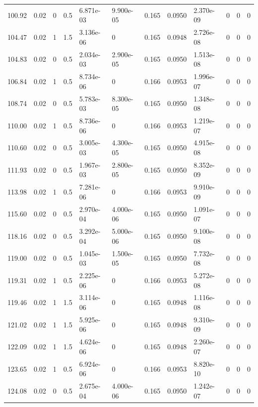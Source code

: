 \documentclass[preview]{standalone}
\begin{document}
{{{\begin{tabular}{L{1.2cm}C{1.2cm} C{0.3cm}C{0.5cm} C{1.4cm}C{1.4cm} C{1.4cm}C{1.4cm} C{1.6cm}C{1.6cm} C{1.6cm}C{1.6cm}}
  100.92  &  0.02  & 0     & 0.5 &  6.871e-03  & 9.900e-05  &  0.165&   0.0950& 2.370e-09 & 0   &  0 & 0  \\ 
  104.47  &  0.02  & 1     & 1.5 &  3.136e-06  & 0  &  0.165&   0.0948& 2.726e-08 & 0   &  0 & 0  \\ 
  104.83  &  0.02  & 0     & 0.5 &  2.034e-03  & 2.900e-05  &  0.165&   0.0950& 1.513e-08 & 0   &  0 & 0  \\ 
  106.84  &  0.02  & 1     & 0.5 &  8.734e-06  & 0  &  0.166&   0.0953& 1.996e-07 & 0   &  0 & 0  \\ 
  108.74  &  0.02  & 0     & 0.5 &  5.783e-03  & 8.300e-05  &  0.165&   0.0950& 1.348e-08 & 0   &  0 & 0  \\ 
  110.00  &  0.02  & 1     & 0.5 &  8.736e-06  & 0  &  0.166&   0.0953& 1.219e-07 & 0   &  0 & 0  \\ 
  110.60  &  0.02  & 0     & 0.5 &  3.005e-03  & 4.300e-05  &  0.165&   0.0950& 4.915e-08 & 0   &  0 & 0  \\ 
  111.93  &  0.02  & 0     & 0.5 &  1.967e-03  & 2.800e-05  &  0.165&   0.0950& 8.352e-09 & 0   &  0 & 0  \\ 
  113.98  &  0.02  & 1     & 0.5 &  7.281e-06  & 0  &  0.166&   0.0953& 9.910e-09 & 0   &  0 & 0  \\ 
  115.60  &  0.02  & 0     & 0.5 &  2.970e-04  & 4.000e-06  &  0.165&   0.0950& 1.091e-07 & 0   &  0 & 0  \\ 
  118.16  &  0.02  & 0     & 0.5 &  3.292e-04  & 5.000e-06  &  0.165&   0.0950& 9.100e-08 & 0   &  0 & 0  \\ 
  119.00  &  0.02  & 0     & 0.5 &  1.045e-03  & 1.500e-05  &  0.165&   0.0950& 7.732e-08 & 0   &  0 & 0  \\ 
  119.31  &  0.02  & 1     & 0.5 &  2.225e-06  & 0  &  0.166&   0.0953& 5.272e-08 & 0   &  0 & 0  \\ 
  119.46  &  0.02  & 1     & 1.5 &  3.114e-06  & 0  &  0.165&   0.0948& 1.116e-08 & 0   &  0 & 0  \\ 
  121.02  &  0.02  & 1     & 1.5 &  5.925e-06  & 0  &  0.165&   0.0948& 9.310e-09 & 0   &  0 & 0  \\ 
  122.09  &  0.02  & 1     & 1.5 &  4.624e-06  & 0  &  0.165&   0.0948& 2.260e-07 & 0   &  0 & 0  \\ 
  123.65  &  0.02  & 1     & 0.5 &  6.924e-06  & 0  &  0.166&   0.0953& 8.820e-10 & 0   &  0 & 0  \\ 
  124.08  &  0.02  & 0     & 0.5 &  2.675e-04  & 4.000e-06  &  0.165&   0.0950& 1.242e-07 & 0   &  0 & 0  \\ 

\end{tabular}}}}
\end{document}
